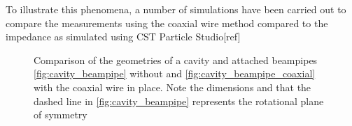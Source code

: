 To illustrate this phenomena, a number of simulations have been carried out to compare the measurements using the coaxial wire method compared to the impedance as simulated using CST Particle Studio[ref]

\begin{figure}
\caption{Comparison of the geometries of a cavity and attached beampipes \ref{fig:cavity_beampipe} without and \ref{fig:cavity_beampipe_coaxial} with the coaxial wire in place. Note the dimensions and that the dashed line in \ref{fig:cavity_beampipe} represents the rotational plane of symmetry}

\end{figure}

%
%
%
%
%
%
%
%
%
%
%
